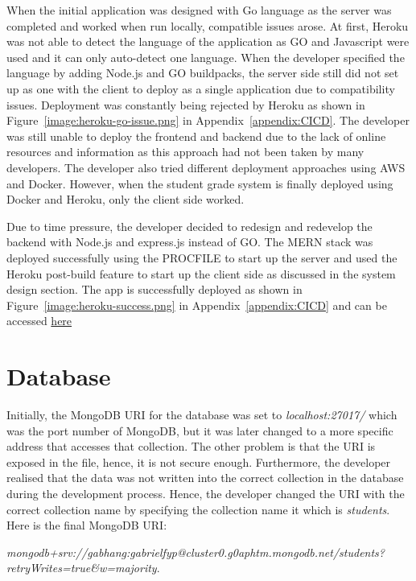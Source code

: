 When the initial application was designed with Go language as the server was completed and worked when run locally, compatible issues arose. At first, Heroku was not able to detect the language of the application as GO and Javascript were used and it can only auto-detect one language. When the developer specified the language by adding Node.js and GO buildpacks, the server side still did not set up as one with the client to deploy as a single application due to compatibility issues. Deployment was constantly being rejected by Heroku as shown in Figure~\ref{image:heroku-go-issue.png} in Appendix~\ref{appendix:CICD}. The developer was still unable to deploy the frontend and backend due to the lack of online resources and information as this approach had not been taken by many developers. The developer also tried different deployment approaches using AWS and Docker. However, when the student grade system is finally deployed using Docker and Heroku, only the client side worked. 

Due to time pressure, the developer decided to redesign and redevelop the backend with Node.js and express.js instead of GO. The MERN stack was deployed successfully using the PROCFILE to start up the server and used the Heroku post-build feature to start up the client side as discussed in the system design section. The app is successfully deployed as shown in Figure~\ref{image:heroku-success.png} in Appendix~\ref{appendix:CICD} and can be accessed \href{https://student-grade-system.herokuapp.com/}{here} 

\section{Database}
Initially, the MongoDB URI for the database was set to \textit{localhost:27017/} which was the port number of MongoDB, but it was later changed to a more specific address that accesses that collection. The other problem is that the URI is exposed in the file, hence, it is not secure enough. Furthermore, the developer realised that the data was not written into the correct collection in the database during the development process. Hence, the developer changed the URI with the correct collection name by specifying the collection name it which is \textit{students}. Here is the final MongoDB URI: 

\textit{mongodb+srv://gabhang:gabrielfyp@cluster0.g0aphtm.mongodb.net/students?\newline retryWrites=true\&w=majority}. 

